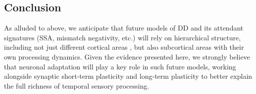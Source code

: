 \documentclass[10pt,letterpaper]{article}
\begin{document}
\subsection*{Conclusion}

As alluded to above, we anticipate that future models of DD and its attendant signatures (SSA, mismatch negativity, etc.) will rely on hierarchical structure, including not just different cortical areas \cite{May2015-lt, Park2020-oa}, but also subcortical areas with their own processing dynamics. Given the evidence presented here, we strongly believe that neuronal adaptation will play a key role in such future models, working alongside synaptic short-term plasticity \cite{Yarden2017-eh} and long-term plasticity \cite{Hertag2020-kc} to better explain the full richness of temporal sensory processing.

\nolinenumbers
\end{document}
